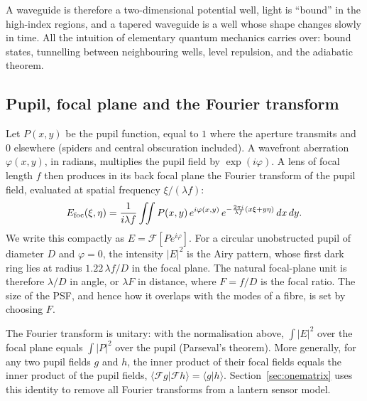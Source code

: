 \documentclass[11pt,a4paper]{article}
\newcommand{\braket}[2]{\langle #1|#2\rangle}
\begin{document}
A waveguide is therefore a two-dimensional potential well, light is ``bound'' in the high-index regions, and a tapered waveguide is a well whose shape changes slowly in time. All the intuition of elementary quantum mechanics carries over: bound states, tunnelling between neighbouring wells, level repulsion, and the adiabatic theorem.

\subsection{Pupil, focal plane and the Fourier transform}
Let $P(x,y)$ be the pupil function, equal to $1$ where the aperture transmits and $0$ elsewhere (spiders and central obscuration included). A wavefront aberration $\varphi(x,y)$, in radians, multiplies the pupil field by $\exp(i\varphi)$. A lens of focal length $f$ then produces in its back focal plane the Fourier transform of the pupil field, evaluated at spatial frequency $\xi/(\lambda f)$:
\begin{equation}
E_{\rm foc}(\xi,\eta) = \frac{1}{i\lambda f} \iint P(x,y)\,
e^{i\varphi(x,y)}\, e^{-\frac{2\pi i}{\lambda f}(x\xi + y\eta)}\, dx\, dy.
\label{eq:fourier}
\end{equation}
We write this compactly as $E = \mathcal{F}[P e^{i\varphi}]$. For a circular unobstructed pupil of diameter $D$ and $\varphi = 0$, the intensity $|E|^2$ is the Airy pattern, whose first dark ring lies at radius $1.22\,\lambda f/D$ in the focal plane. The natural focal-plane unit is therefore $\lambda/D$ in angle, or $\lambda F$ in distance, where $F = f/D$ is the focal ratio. The size of the PSF, and hence how it overlaps with the modes of a fibre, is set by choosing $F$.

The Fourier transform is unitary: with the normalisation above, $\int |E|^2$ over the focal plane equals $\int |P|^2$ over the pupil (Parseval's theorem). More generally, for any two pupil fields $g$ and $h$, the inner product of their focal fields equals the inner product of the pupil fields, $\braket{\mathcal{F}g}{\mathcal{F}h} = \braket{g}{h}$. Section~\ref{sec:onematrix} uses this identity to remove all Fourier transforms from a lantern sensor model.
\end{document}
